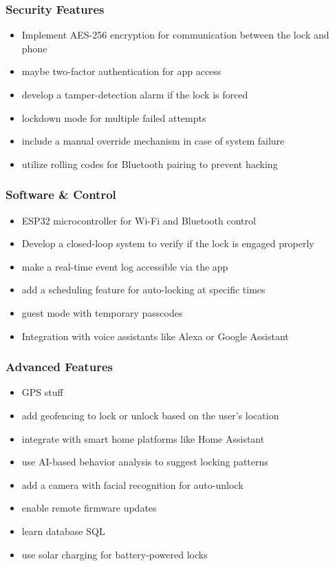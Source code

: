 \subsubsection*{Security Features}
\begin{itemize}
    \item Implement AES-256 encryption for communication between the lock and phone
    \item maybe two-factor authentication for app access
    \item develop a tamper-detection alarm if the lock is forced
    \item lockdown mode for multiple failed attempts
    \item include a manual override mechanism in case of system failure
    \item utilize rolling codes for Bluetooth pairing to prevent hacking
\end{itemize}

\subsubsection*{Software \& Control}
\begin{itemize}
    \item ESP32 microcontroller for Wi-Fi and Bluetooth control
    \item Develop a closed-loop system to verify if the lock is engaged properly
    \item make a real-time event log accessible via the app
    \item add a scheduling feature for auto-locking at specific times
    \item guest mode with temporary passcodes
    \item Integration with voice assistants like Alexa or Google Assistant
\end{itemize}

\subsubsection*{Advanced Features}
\begin{itemize}
    \item GPS stuff
    \item add geofencing to lock or unlock based on the user's location
    \item integrate with smart home platforms like Home Assistant
    \item use AI-based behavior analysis to suggest locking patterns
    \item add a camera with facial recognition for auto-unlock
    \item enable remote firmware updates
    \item learn database SQL
    \item use solar charging for battery-powered locks
\end{itemize}

